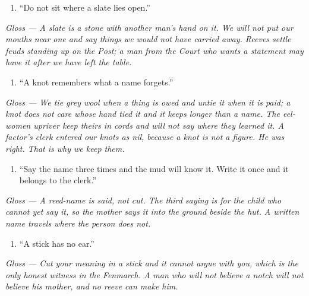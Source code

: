 \documentclass{design/chronicle}
\begin{document}
\begin{enumerate}[leftmargin=1.4em,itemsep=1pt,topsep=3pt,parsep=0pt]

\item “Do not sit where a slate lies open.”

\end{enumerate}

\emph{Gloss — A slate is a stone with another man’s hand on it. We will not put our mouths near one and say things we would not have carried away. Reeves settle feuds standing up on the Post; a man from the Court who wants a statement may have it after we have left the table.}

\begin{enumerate}[leftmargin=1.4em,itemsep=1pt,topsep=3pt,parsep=0pt]

\item “A knot remembers what a name forgets.”

\end{enumerate}

\emph{Gloss — We tie grey wool when a thing is owed and untie it when it is paid; a knot does not care whose hand tied it and it keeps longer than a name. The eel-women upriver keep theirs in cords and will not say where they learned it. A factor’s clerk entered our knots as nil, because a knot is not a figure. He was right. That is why we keep them.}

\begin{enumerate}[leftmargin=1.4em,itemsep=1pt,topsep=3pt,parsep=0pt]

\item “Say the name three times and the mud will know it. Write it once and it belongs to the clerk.”

\end{enumerate}

\emph{Gloss — A reed-name is said, not cut. The third saying is for the child who cannot yet say it, so the mother says it into the ground beside the hut. A written name travels where the person does not.}

\begin{enumerate}[leftmargin=1.4em,itemsep=1pt,topsep=3pt,parsep=0pt]

\item “A stick has no ear.”

\end{enumerate}

\emph{Gloss — Cut your meaning in a stick and it cannot argue with you, which is the only honest witness in the Fenmarch. A man who will not believe a notch will not believe his mother, and no reeve can make him.}
\end{document}
